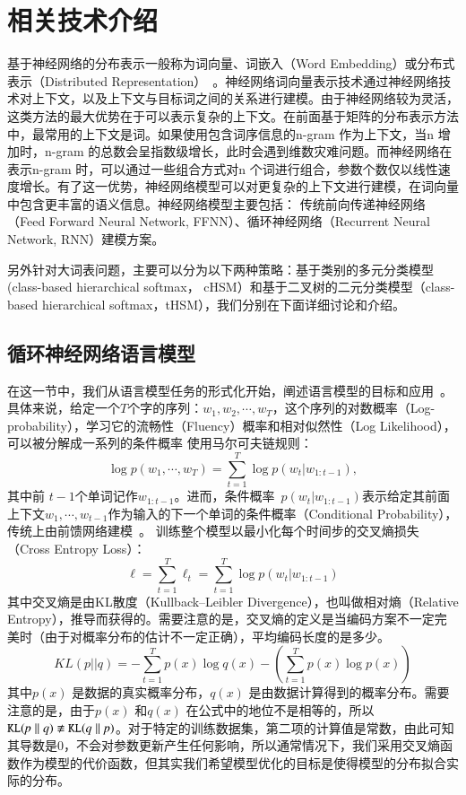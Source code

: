 \chapter{相关技术介绍}
基于神经网络的分布表示一般称为词向量、词嵌入（Word Embedding）或分布式表示（Distributed Representation）~。神经网络词向量表示技术通过神经网络技术对上下文，以及上下文与目标词之间的关系进行建模。由于神经网络较为灵活，这类方法的最大优势在于可以表示复杂的上下文。在前面基于矩阵的分布表示方法中，最常用的上下文是词。如果使用包含词序信息的n-gram 作为上下文，当n 增加时，n-gram 的总数会呈指数级增长，此时会遇到维数灾难问题。而神经网络在表示n-gram 时，可以通过一些组合方式对n 个词进行组合，参数个数仅以线性速度增长。有了这一优势，神经网络模型可以对更复杂的上下文进行建模，在词向量中包含更丰富的语义信息。神经网络模型主要包括： 传统前向传递神经网络（Feed Forward Neural Network, FFNN）、循环神经网络（Recurrent Neural Network, RNN）建模方案。

另外针对大词表问题，主要可以分为以下两种策略：基于类别的多元分类模型(class-based hierarchical softmax， cHSM）和基于二叉树的二元分类模型（class-based hierarchical softmax，tHSM），我们分别在下面详细讨论和介绍。

\section{循环神经网络语言模型}
在这一节中，我们从语言模型任务的形式化开始，阐述语言模型的目标和应用~。 具体来说，给定一个$T$个字的序列：$w_1,w_2,\cdots,w_T$，这个序列的对数概率（Log-probability），学习它的流畅性（Fluency）概率和相对似然性（Log Likelihood），可以被分解成一系列的条件概率 使用马尔可夫链规则：
\begin{equation}
\label{laguage_model}
 \log p(w_1,\cdots, w_T ) = \sum_{t=1}^T \log p(w_t | w_{1:t-1}),
\end{equation}
其中前 $t-1$个单词记作$w_ {1:t-1}$。进而，条件概率~$p(w_t | w_ {1:t-1})$表示给定其前面上下文$ w_1,\cdots,w_ {t-1} $作为输入的下一个单词的条件概率（Conditional Probability）， 传统上由前馈网络建模~。 训练整个模型以最小化每个时间步的交叉熵损失（Cross Entropy Loss）：
\begin{equation}\label{equ:losses}
  \ell=\sum_{t=1}^{T}\ell_t=\sum_{t=1}^{T}\log p(w_t | w_{1:t-1})
\end{equation}
其中交叉熵是由KL散度（Kullback–Leibler Divergence），也叫做相对熵（Relative Entropy），推导而获得的。需要注意的是，交叉熵的定义是当编码方案不一定完美时（由于对概率分布的估计不一定正确），平均编码长度的是多少。
\begin{equation}\label{equ:losses}
  KL(p||q)=-\sum_{t=1}^{T}p(x)\log q(x) - (\sum_{t=1}^{T}p(x)\log p(x))
\end{equation}
其中$p(x)$ 是数据的真实概率分布，$q(x)$ 是由数据计算得到的概率分布。需要注意的是，由于$p(x)$ 和$q(x)$ 在公式中的地位不是相等的，所以$\tt KL \it(p\parallel q)\not\equiv \tt KL \it (q\parallel p)$。对于特定的训练数据集，第二项的计算值是常数，由此可知其导数是0，不会对参数更新产生任何影响，所以通常情况下，我们采用交叉熵函数作为模型的代价函数，但其实我们希望模型优化的目标是使得模型的分布拟合实际的分布。

